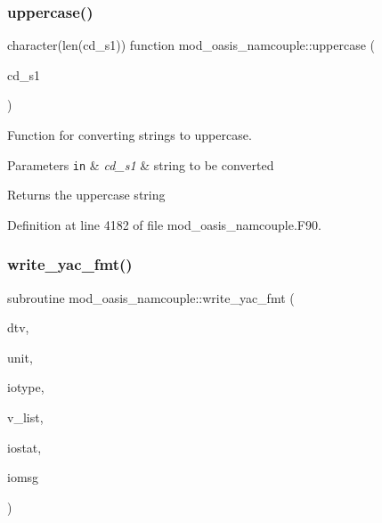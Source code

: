 \mbox{\label{namespacemod__oasis__namcouple_a14ea756ea43e135e67ee706e48fbf780}} 
\subsubsection{\texorpdfstring{uppercase()}{uppercase()}}
{\footnotesize\ttfamily character(len(cd\+\_\+s1)) function mod\+\_\+oasis\+\_\+namcouple\+::uppercase (\begin{DoxyParamCaption}\item[{character($\ast$), intent(in)}]{cd\+\_\+s1 }\end{DoxyParamCaption})\hspace{0.3cm}{\ttfamily [private]}}



Function for converting strings to uppercase. 


\begin{DoxyParams}[1]{Parameters}
\mbox{\tt in}  & {\em cd\+\_\+s1} & string to be converted \\
\hline
\end{DoxyParams}
\begin{DoxyReturn}{Returns}
the uppercase string 
\end{DoxyReturn}


Definition at line 4182 of file mod\+\_\+oasis\+\_\+namcouple.\+F90.

\mbox{\label{namespacemod__oasis__namcouple_a72b54d7a959dad1e6c65e9381baa48bf}} 
\subsubsection{\texorpdfstring{write\+\_\+yac\+\_\+fmt()}{write\_yac\_fmt()}}
{\footnotesize\ttfamily subroutine mod\+\_\+oasis\+\_\+namcouple\+::write\+\_\+yac\+\_\+fmt (\begin{DoxyParamCaption}\item[{class(\hyperlink{structmod__oasis__namcouple_1_1yac__parse}{yac\+\_\+parse}), intent(in)}]{dtv,  }\item[{integer, intent(in)}]{unit,  }\item[{character(len=$\ast$), intent(in)}]{iotype,  }\item[{integer, dimension(\+:), intent(in)}]{v\+\_\+list,  }\item[{integer, intent(out)}]{iostat,  }\item[{character(len=$\ast$), intent(inout)}]{iomsg }\end{DoxyParamCaption})\hspace{0.3cm}{\ttfamily [private]}}



